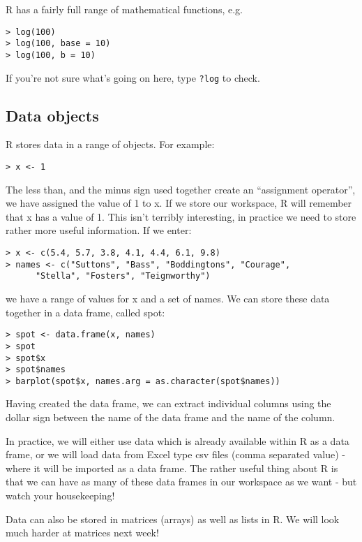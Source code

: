 R has a fairly full range of mathematical functions, e.g.

\begin{verbatim}
> log(100)
> log(100, base = 10)
> log(100, b = 10)
\end{verbatim}

If you're not sure what's going on here, type \texttt{?log} to check.

\subsection{Data objects}

R stores data in a range of objects.   For example:

\begin{verbatim}
> x <- 1
\end{verbatim}

The less than, and the minus sign used together create an ``assignment operator'', we have assigned the value of 1 to x.   If we store our workspace, R will remember that x has a value of 1.   This isn't terribly interesting, in practice we need to store rather more useful information.   If we enter:

\begin{verbatim}
> x <- c(5.4, 5.7, 3.8, 4.1, 4.4, 6.1, 9.8)
> names <- c("Suttons", "Bass", "Boddingtons", "Courage", 
      "Stella", "Fosters", "Teignworthy")
\end{verbatim}

we have a range of values for x and a set of names.   We can store these data together in a data frame, called spot:

\begin{verbatim}
> spot <- data.frame(x, names)
> spot
> spot$x
> spot$names
> barplot(spot$x, names.arg = as.character(spot$names))
\end{verbatim}

Having created the data frame, we can extract individual columns using the dollar sign between the name of the data frame and the name of the column.

In practice, we will either use data which is already available within R as a data frame, or we will load data from Excel type csv files (comma separated value) - where it will be imported as a data frame.   The rather useful thing about R is that we can have as many of these data frames in our workspace as we want - but watch your housekeeping!

Data can also be stored in matrices (arrays) as well as lists in R.   We will look much harder at matrices next week!


